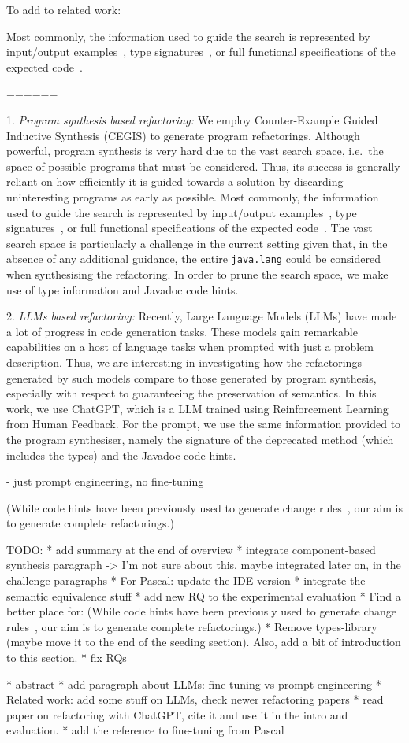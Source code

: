 To add to related work:

Most commonly, the information used to guide the search is represented by input/output examples~\cite{DBLP:conf/pldi/FeserCD15}, type signatures~\cite{DBLP:conf/pldi/OseraZ15}, or full functional specifications of the expected code~\cite{DBLP:conf/ijcai/MannaW79}.


======

1. {\em Program synthesis based refactoring:} 
We employ Counter-Example Guided Inductive Synthesis (CEGIS) to generate program refactorings. 
%
Although powerful, program synthesis is very hard due to the vast search space, i.e.~the space of possible programs that must be considered. Thus, its success is generally reliant on how efficiently it is guided towards a solution by discarding uninteresting programs as early as possible. Most commonly, the information used to guide the search is represented by input/output examples~\cite{DBLP:conf/pldi/FeserCD15}, type signatures~\cite{DBLP:conf/pldi/OseraZ15}, or full functional specifications of the expected code~\cite{DBLP:conf/ijcai/MannaW79}.
%
The vast search space is particularly a challenge in the current
setting given that, in the absence of any additional guidance, the
entire \texttt{java.lang} could be considered when synthesising the
refactoring.  In order to prune the search space, we make use of type information and Javadoc code hints.

2. {\em LLMs based refactoring:} 
Recently, Large Language Models (LLMs) have made a lot of progress in code generation tasks. 
These models gain remarkable capabilities on a host of language tasks when prompted with just a problem description.
Thus, we are interesting in investigating how the refactorings generated by such models compare to those generated by program synthesis,
especially with respect to guaranteeing the preservation of semantics. In this work, we use
ChatGPT, which is a LLM trained using Reinforcement Learning from Human Feedback.
%
For the prompt, we use the same information provided to the program synthesiser, namely the signature of the deprecated method (which includes the types) and the Javadoc code hints.

- just prompt engineering, no fine-tuning

(While code hints have been previously used to generate change rules~\cite{DBLP:conf/kbse/Huang0PW021}, our aim is to generate complete refactorings.)

TODO:
* add summary at the end of overview
* integrate component-based synthesis paragraph -> I'm not sure about this, maybe integrated later on, in the challenge paragraphs
* For Pascal: update the IDE version
* integrate the semantic equivalence stuff
* add new RQ to the experimental evaluation
* Find a better place for: (While code hints have been previously used to generate change rules~\cite{DBLP:conf/kbse/Huang0PW021}, our aim is to generate complete refactorings.)
* Remove types-library (maybe move it to the end of the seeding section). Also, add a bit of introduction to this section.
* fix RQs


* abstract
* add paragraph about LLMs: fine-tuning vs prompt engineering
* Related work: add some stuff on LLMs, check newer refactoring papers
* read paper on refactoring with ChatGPT, cite it and use it in the intro and evaluation.
* add the reference to fine-tuning from Pascal

